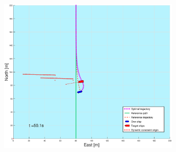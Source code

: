 \begin{figure}[!b]
\begin{subfigure}[b]{0.49\textwidth}
    \end{subfigure}
    \hfill
    \begin{subfigure}[b]{0.499\textwidth}
        \centering
        \includegraphics[width=\textwidth]{Images/Figures/sving_GW/_Simple_0fig999_time=50}
    \end{subfigure}
    \hfill
\end{figure}%

